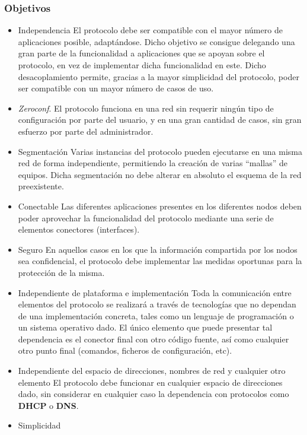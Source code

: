 \subsubsection{Objetivos}
\begin{itemize}%
	\item Independencia
	El protocolo debe ser compatible con el mayor número de aplicaciones posible, adaptándose. Dicho objetivo se consigue delegando una gran parte de la funcionalidad a aplicaciones que se apoyan sobre el protocolo, en vez de implementar dicha funcionalidad en este. Dicho desacoplamiento permite, gracias a la mayor simplicidad del protocolo, poder ser compatible con un mayor número de casos de uso.
	\item \textit{Zeroconf}.
	El protocolo funciona en una red sin requerir ningún tipo de configuración por parte del usuario, y en una gran cantidad de casos, sin gran esfuerzo por parte del administrador. %
	\item Segmentación
	Varias instancias del protocolo pueden ejecutarse en una misma red de forma independiente, permitiendo la creación de varias ``mallas'' de equipos. Dicha segmentación no debe alterar en absoluto el esquema de la red preexistente.
	\item Conectable
	Las diferentes aplicaciones presentes en los diferentes nodos deben poder aprovechar la funcionalidad del protocolo mediante una serie de elementos conectores (interfaces).
	\item Seguro
	En aquellos casos en los que la información compartida por los nodos sea confidencial, el protocolo debe implementar las medidas oportunas para la protección de la misma.
	\item Independiente de plataforma e implementación
	Toda la comunicación entre elementos del protocolo se realizará a través de tecnologías que no dependan de una implementación concreta, tales como un lenguaje de programación o un sistema operativo dado. El único elemento que puede presentar tal dependencia es el conector final con otro código fuente, así como cualquier otro punto final (comandos, ficheros de configuración, etc).
	\item Independiente del espacio de direcciones, nombres de red y cualquier otro elemento
	El protocolo debe funcionar en cualquier espacio de direcciones dado, sin considerar en cualquier caso la dependencia con protocolos como \textbf{DHCP} o \textbf{DNS}.
	\item Simplicidad

\end{itemize}
